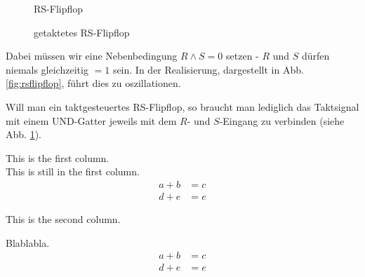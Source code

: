 \documentclass[12pt, a4paper, twopage]{scrartcl}
\begin{document}
\begin{figure}[h!]
\centering
  \centering
    \caption{RS-Flipflop}%
    \label{fig:rsflipflop}
  \endminipage\hspace{1cm}   
%
	\centering
    \caption{getaktetes RS-Flipflop}%
    \label{fig:rsflipfloptakt}
  \endminipage
\end{figure}

Dabei müssen wir eine Nebenbedingung $R \wedge S = 0$ setzen - $R$ und $S$ dürfen niemals gleichzeitig $= 1$ sein. In der Realisierung, dargestellt in Abb. \ref{fig:rsflipflop}, führt dies zu oszillationen. 

Will man ein taktgesteuertes RS-Flipflop, so braucht man lediglich das Taktsignal mit einem UND-Gatter jeweils mit dem $R$- und $S$-Eingang zu verbinden (siehe Abb. \ref{fig:rsflipfloptakt}).\\



\begin{minipage}[t]{0.5\textwidth}
	This is the first column.\\
	
	This is still in the first column.
	\begin{align}
	a+b &= c\\
	d+e &= e
	\end{align}
\end{minipage}
%
%
\begin{minipage}[t]{0.5\textwidth}
	This is the second column.
	
	Blablabla.
	\begin{align*}
	a+b &= c\\
	d+e &= e
	\end{align*}
\end{minipage}
\end{document}
